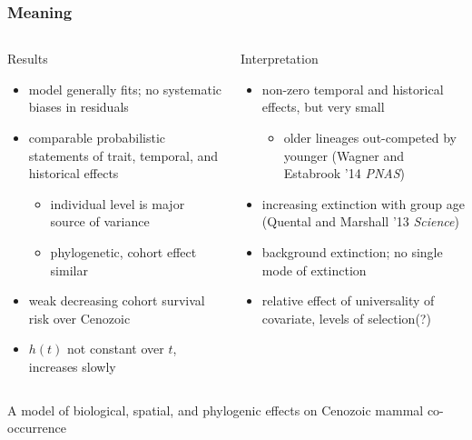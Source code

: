 \documentclass{beamer}
\begin{document}
\begin{frame}
  \frametitle{Meaning}
  \begin{columns}
    \begin{column}{0.5\textwidth}
      Results
      \begin{itemize}
        \item model generally fits; no systematic biases in residuals
        \item comparable probabilistic statements of trait, temporal, and historical effects
          \begin{itemize}
            \item individual level is major source of variance
            \item phylogenetic, cohort effect similar
          \end{itemize}
        \item weak decreasing cohort survival risk over Cenozoic
        \item \(h(t)\) not constant over \(t\), increases slowly
      \end{itemize}
    \end{column}
    \begin{column}{0.5\textwidth}
      Interpretation
      \begin{itemize}
        \item non-zero temporal and historical effects, but very small
          \begin{itemize}
            \item older lineages out-competed by younger (Wagner and Estabrook '14 \textit{PNAS})
          \end{itemize}
        \item increasing extinction with group age (Quental and Marshall '13 \textit{Science})
        \item background extinction; no single mode of extinction
        \item relative effect of universality of covariate, levels of selection(?)
      \end{itemize}
    \end{column}
  \end{columns}
\end{frame}


\begin{frame}
  A model of biological, spatial, and phylogenic effects on Cenozoic mammal co-occurrence
\end{frame}
\end{document}
